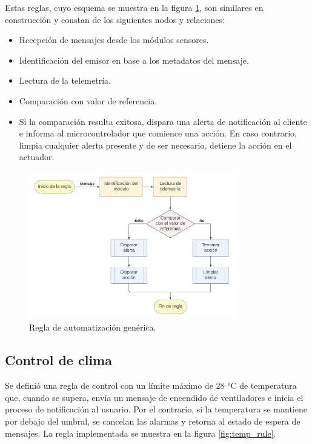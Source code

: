 Estas reglas, cuyo esquema se muestra en la figura \ref{fig:basic_rule}, son similares en construcción y constan de los siguientes nodos y relaciones:

\begin{itemize}
\item Recepción de mensajes desde los módulos sensores.
\item Identificación del emisor en base a los metadatos del mensaje.
\item Lectura de la telemetría.
\item Comparación con valor de referencia.
\item[] Si la comparación resulta exitosa, dispara una alerta de notificación al cliente e informa al microcontrolador que comience una acción. En caso contrario, limpia cualquier alerta presente y de ser necesario, detiene la acción en el actuador.
\end{itemize}





\begin{figure}[h]
	\centering
	\includegraphics[width=0.8\textwidth]{./Figures/chapter4/ReglaBasica.jpg}
	\caption[Regla de automatización genérica]{Regla de automatización genérica.}
	\label{fig:basic_rule}
\end{figure}




\subsection{Control de clima}
\label{sec:Control de clima}

Se definió una regla de control con un límite máximo de 28 °C de temperatura que, cuando se supera, envía un mensaje de encendido de ventiladores e inicia el proceso de notificación  al usuario. Por el contrario, si la temperatura se mantiene por debajo del umbral, se cancelan las alarmas y retorna al estado de espera de mensajes. La regla implementada se muestra en la figura \ref{fig:temp_rule}.  


